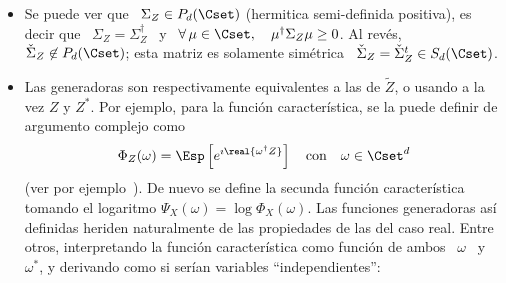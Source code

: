\begin{itemize}
\begin{itemize}
    \[
    \Sigma_{\widetilde{Z}}  = \begin{bmatrix}
      \Sigma_X & \Sigma_{X,Y}\\ \Sigma_{X,Y}^t & \Sigma_Y\end{bmatrix}
    \]
    conteniendo todas las convarianzas, y por el otro lado,
    \[
    \Sigma_Z =  \left( \Sigma_X  + \Sigma_Y \right)  - \imath \left(  \Sigma_{X,Y} -
      \Sigma_{X,Y}^t \right)
    \]
    Se puede  ver que  la covarianza de  $Z$ no  contiene todos los  terminos de
    orden  2.  Por  eso, se  define  tambi\'en la  {\em pseudo-covarianza},  sin
    terminos conjugados,
    \[
    \check{\Sigma}_Z \equiv \pCov[Z] \equiv \Esp\left[ (Z-m_Z) (Z-m_Z)^t \right]
    \]
    Ahora, se puede ver que
    \[
    \check{\Sigma}_Z  =  \left( \Sigma_X  -  \Sigma_Y  \right)  + \imath  \left(
      \Sigma_{X,Y} + \Sigma_{X,Y}^t \right)
    \]
    Entonces,  se  recupera  inmediatamente   $\Sigma_X,  \:  \Sigma_Y$  \  y  \
    $\Sigma_{X,Y}$  \  a  partir  de  \ $\Sigma_Z$  \  y  \  $\check{\Sigma}_Z$;
    Claramente,  los  momentos  centrales de  orden  2  son  dados por  ambas  \
    $\Sigma_Z$ \ y \ $\check{\Sigma}_Z$.
  \end{itemize}
  Los momentos  as\'i definidos heriden  naturalmente de las propiedades  de las
  del caso real.
%
\item  Se puede  ver que  \ $\Sigma_Z  \in P_d(\Cset)$  (hermitica semi-definida
  positiva), es decir que \ $\Sigma_Z = \Sigma_Z^\dag$ \ y \ $\forall \, \mu \in
  \Cset,  \quad \mu^\dag  \Sigma_Z \mu  \ge 0$.   Al  rev\'es, $\check{\Sigma}_Z
  \not\in P_d(\Cset)$; esta matriz  es solamente sim\'etrica \ $\check{\Sigma}_Z
  = \check{\Sigma}_Z^t \in S_d(\Cset)$.
%
\item Las generadoras son respectivamente equivalentes a las de $\widetilde{Z}$,
  o  usando   a  la  vez   $Z$  y  $Z^*$.    Por  ejemplo,  para   la  funci\'on
  caracter\'istica, se la puede definir de argumento complejo como
  \[
  \Phi_Z(\omega)  =  \Esp\left[ e^{\imath  \real{\omega^\dag  Z}} \right]  \quad
  \mbox{con} \quad \omega \in \Cset^d
  \]
  (ver  por  ejemplo~\cite[Cap.~17]{Lap17}).   De  nuevo se  define  la  secunda
  funci\'on  caracter\'istica  tomando   el  logaritmo  $\Psi_X(\omega)  =  \log
  \Phi_X(\omega)$.    Las   funciones   generadoras  as\'i   definidas   heriden
  naturalmente  de  las  propiedades  de   las  del  caso  real.   Entre  otros,
  interpretando la funci\'on caracter\'istica como funci\'on de ambos \ $\omega$
  \ y \ $\omega^*$, y derivando como si ser\'ian variables ``independientes'':

\end{itemize}
